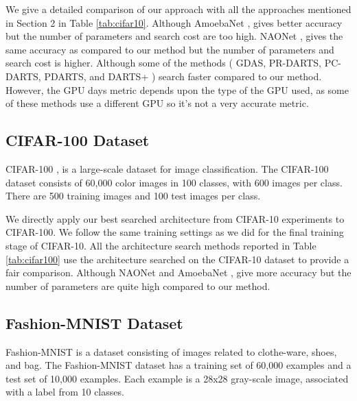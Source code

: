 \documentclass[10pt,a4paper,conference]{IEEEtran}
\begin{document}
We give a detailed comparison of our approach with all the approaches mentioned in Section 2 in Table \ref{tab:cifar10}. Although AmoebaNet \cite{real2019regularized:7}, gives better accuracy but the number of parameters and search cost are too high. NAONet \cite{luo2018neural:9}, gives the same accuracy as compared to our method but the number of parameters and search cost is higher. Although some of the methods ( GDAS, PR-DARTS, PC-DARTS, PDARTS, and DARTS+ ) search faster compared to our method. However, the GPU days metric depends upon the type of the GPU used, as some of these methods use a different GPU so it's not a very accurate metric. 
\subsection{CIFAR-100 Dataset}
\noindent CIFAR-100 \cite{krizhevsky2009learning:21}, is a large-scale dataset for image classification. The CIFAR-100 dataset consists of 60,000  color images in 100 classes, with 600 images per class. There are 500 training images and 100 test images per class.

We directly apply our best searched architecture from CIFAR-10 experiments to CIFAR-100. We follow the same training settings as we did for the final training stage of CIFAR-10. All the architecture search methods reported in Table \ref{tab:cifar100} use the architecture searched on the CIFAR-10 dataset to provide a fair comparison. Although NAONet \cite{luo2018neural:9} and AmoebaNet \cite{RealAggarwalHuangLe2018:5}, give more accuracy but the number of parameters are quite high compared to our method. 


\subsection{Fashion-MNIST Dataset}
Fashion-MNIST \cite{xiao2017/online:26} is a dataset consisting of images related to clothe-ware, shoes, and bag.  The Fashion-MNIST dataset has a training set of 60,000 examples and a test set of 10,000 examples. Each example is a 28x28 gray-scale image, associated with a label from 10 classes. 
\end{document}
